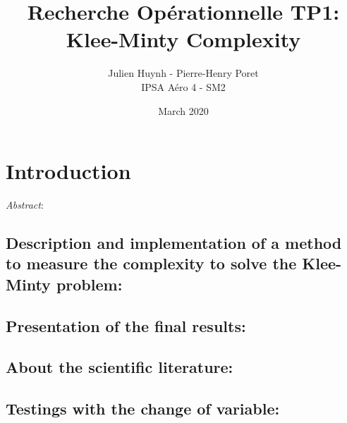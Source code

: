 \documentclass[twocolumn]{article}
\title{Recherche Opérationnelle TP1: Klee-Minty Complexity}
\author{Julien Huynh - Pierre-Henry Poret \\
        IPSA Aéro 4 - SM2}
\date{March 2020}
\begin{document}
\maketitle



\section{Introduction}

\textit{Abstract}:  

\subsection{Description and implementation of a method to measure the complexity to solve the Klee-Minty problem:}

\subsection{Presentation of the final results:}

\subsection{About the scientific literature:}

\subsection{Testings with the change of variable:}
\end{document}
